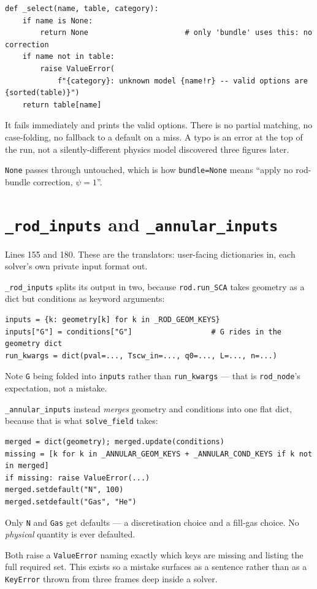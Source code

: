 \documentclass[11pt]{article}
\newcommand{\code}[1]{\texttt{#1}}
\begin{document}
\begin{lstlisting}
def _select(name, table, category):
    if name is None:
        return None                      # only 'bundle' uses this: no correction
    if name not in table:
        raise ValueError(
            f"{category}: unknown model {name!r} -- valid options are {sorted(table)}")
    return table[name]
\end{lstlisting}

It fails immediately and prints the valid options. There is no partial matching, no
case-folding, no fallback to a default on a miss. A typo is an error at the top of the
run, not a silently-different physics model discovered three figures later.

\code{None} passes through untouched, which is how \code{bundle=None} means ``apply no
rod-bundle correction, $\psi = 1$''.

\section{\code{\_rod\_inputs} and \code{\_annular\_inputs}}
Lines 155 and 180. These are the translators: user-facing dictionaries in, each solver's
own private input format out.

\code{\_rod\_inputs} splits its output in two, because \code{rod.run\_SCA} takes geometry
as a dict but conditions as keyword arguments:
\begin{lstlisting}
inputs = {k: geometry[k] for k in _ROD_GEOM_KEYS}
inputs["G"] = conditions["G"]                  # G rides in the geometry dict
run_kwargs = dict(pval=..., Tscw_in=..., q0=..., L=..., n=...)
\end{lstlisting}
Note \code{G} being folded into \code{inputs} rather than \code{run\_kwargs} --- that is
\code{rod\_node}'s expectation, not a mistake.

\code{\_annular\_inputs} instead \emph{merges} geometry and conditions into one flat
dict, because that is what \code{solve\_field} takes:
\begin{lstlisting}
merged = dict(geometry); merged.update(conditions)
missing = [k for k in _ANNULAR_GEOM_KEYS + _ANNULAR_COND_KEYS if k not in merged]
if missing: raise ValueError(...)
merged.setdefault("N", 100)
merged.setdefault("Gas", "He")
\end{lstlisting}
Only \code{N} and \code{Gas} get defaults --- a discretisation choice and a fill-gas
choice. No \emph{physical} quantity is ever defaulted.

Both raise a \code{ValueError} naming exactly which keys are missing and listing the
full required set. This exists so a mistake surfaces as a sentence rather than as a
\code{KeyError} thrown from three frames deep inside a solver.
\end{document}
